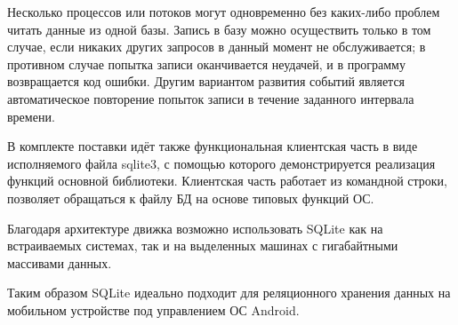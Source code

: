 Несколько процессов или потоков могут одновременно без каких-либо проблем читать данные из одной базы. Запись в базу можно осуществить только в том случае, если никаких других запросов в данный момент не обслуживается; в противном случае попытка записи оканчивается неудачей, и в программу возвращается код ошибки. Другим вариантом развития событий является автоматическое повторение попыток записи в течение заданного интервала времени.

В комплекте поставки идёт также функциональная клиентская часть в виде исполняемого файла sqlite3, с помощью которого демонстрируется реализация функций основной библиотеки. Клиентская часть работает из командной строки, позволяет обращаться к файлу БД на основе типовых функций ОС.

Благодаря архитектуре движка возможно использовать SQLite как на встраиваемых системах, так и на выделенных машинах с гигабайтными массивами данных.

Таким образом SQLite идеально подходит для реляционного хранения данных на мобильном устройстве под управлением ОС Android.




